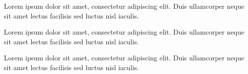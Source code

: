 \documentclass[12pt, a4paper]{awesome-cv}
\begin{document}
\makecvheader[R]
\makecvfooter{}{}{}
\makelettertitle

\begin{cvletter}

Lorem ipsum dolor sit amet, consectetur adipiscing elit. Duis ullamcorper neque sit amet lectus facilisis sed luctus nisl iaculis.

Lorem ipsum dolor sit amet, consectetur adipiscing elit. Duis ullamcorper neque sit amet lectus facilisis sed luctus nisl iaculis.

Lorem ipsum dolor sit amet, consectetur adipiscing elit. Duis ullamcorper neque sit amet lectus facilisis sed luctus nisl iaculis.

\end{cvletter}

\makeletterclosing
\end{document}
